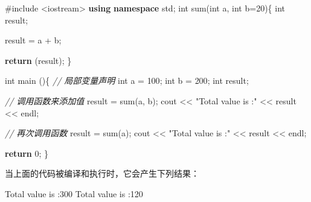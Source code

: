 \documentclass[
]{article}
\newenvironment{Shaded}{}{}
\newcommand{\CommentTok}[1]{\textcolor[rgb]{0.38,0.63,0.69}{\textit{#1}}}
\newcommand{\ControlFlowTok}[1]{\textcolor[rgb]{0.00,0.44,0.13}{\textbf{#1}}}
\newcommand{\DataTypeTok}[1]{\textcolor[rgb]{0.56,0.13,0.00}{#1}}
\newcommand{\DecValTok}[1]{\textcolor[rgb]{0.25,0.63,0.44}{#1}}
\newcommand{\ImportTok}[1]{#1}
\newcommand{\KeywordTok}[1]{\textcolor[rgb]{0.00,0.44,0.13}{\textbf{#1}}}
\newcommand{\NormalTok}[1]{#1}
\newcommand{\OperatorTok}[1]{\textcolor[rgb]{0.40,0.40,0.40}{#1}}
\newcommand{\PreprocessorTok}[1]{\textcolor[rgb]{0.74,0.48,0.00}{#1}}
\newcommand{\StringTok}[1]{\textcolor[rgb]{0.25,0.44,0.63}{#1}}
\begin{document}
\begin{Shaded}
\begin{Highlighting}[]
\PreprocessorTok{\#include }\ImportTok{\textless{}iostream\textgreater{}}
\KeywordTok{using} \KeywordTok{namespace}\NormalTok{ std}\OperatorTok{;}
\DataTypeTok{int}\NormalTok{ sum}\OperatorTok{(}\DataTypeTok{int}\NormalTok{ a}\OperatorTok{,} \DataTypeTok{int}\NormalTok{ b}\OperatorTok{=}\DecValTok{20}\OperatorTok{)\{}
  \DataTypeTok{int}\NormalTok{ result}\OperatorTok{;}

\NormalTok{  result }\OperatorTok{=}\NormalTok{ a }\OperatorTok{+}\NormalTok{ b}\OperatorTok{;}
  
  \ControlFlowTok{return} \OperatorTok{(}\NormalTok{result}\OperatorTok{);}
\OperatorTok{\}}

\DataTypeTok{int}\NormalTok{ main }\OperatorTok{()\{}
   \CommentTok{// 局部变量声明}
   \DataTypeTok{int}\NormalTok{ a }\OperatorTok{=} \DecValTok{100}\OperatorTok{;}
   \DataTypeTok{int}\NormalTok{ b }\OperatorTok{=} \DecValTok{200}\OperatorTok{;}
   \DataTypeTok{int}\NormalTok{ result}\OperatorTok{;}
 
   \CommentTok{// 调用函数来添加值}
\NormalTok{   result }\OperatorTok{=}\NormalTok{ sum}\OperatorTok{(}\NormalTok{a}\OperatorTok{,}\NormalTok{ b}\OperatorTok{);}
\NormalTok{   cout }\OperatorTok{\textless{}\textless{}} \StringTok{"Total value is :"} \OperatorTok{\textless{}\textless{}}\NormalTok{ result }\OperatorTok{\textless{}\textless{}}\NormalTok{ endl}\OperatorTok{;}

   \CommentTok{// 再次调用函数}
\NormalTok{   result }\OperatorTok{=}\NormalTok{ sum}\OperatorTok{(}\NormalTok{a}\OperatorTok{);}
\NormalTok{   cout }\OperatorTok{\textless{}\textless{}} \StringTok{"Total value is :"} \OperatorTok{\textless{}\textless{}}\NormalTok{ result }\OperatorTok{\textless{}\textless{}}\NormalTok{ endl}\OperatorTok{;}
 
   \ControlFlowTok{return} \DecValTok{0}\OperatorTok{;}
\OperatorTok{\}}
\end{Highlighting}
\end{Shaded}

当上面的代码被编译和执行时，它会产生下列结果：

\begin{Shaded}
\begin{Highlighting}[]
\NormalTok{Total value is }\OperatorTok{:}\DecValTok{300}
\NormalTok{Total value is }\OperatorTok{:}\DecValTok{120}
\end{Highlighting}
\end{Shaded}
\end{document}
